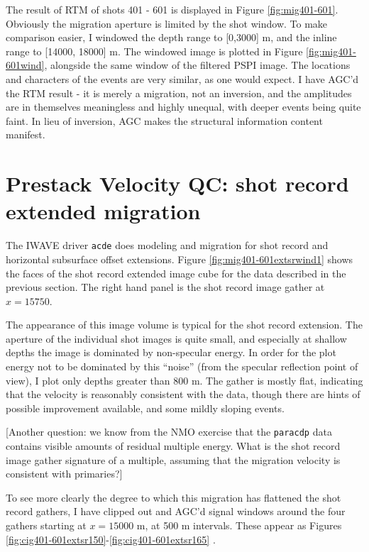 The result of RTM of shots 401 - 601 is displayed in Figure \ref{fig:mig401-601}. Obviously the migration aperture is limited by the shot window. To make comparison easier, I windowed the depth range to [0,3000] m, and the inline range to [14000, 18000] m. The windowed image is plotted in Figure \ref{fig:mig401-601wind}, alongside the same window of the filtered PSPI image. The locations and characters of the events are very similar, as one would expect. I have AGC'd the RTM result - it is merely a migration, not an inversion, and the amplitudes are in themselves meaningless and highly unequal, with deeper events being quite faint. In lieu of inversion, AGC makes the structural information content manifest.

\section{Prestack Velocity QC: shot record extended migration}

The IWAVE driver {\tt acde} does modeling and migration for shot record and horizontal subsurface offset extensions. Figure \ref{fig:mig401-601extsrwind1} shows the faces of the shot record extended image cube for the data described in the previous section. The right hand panel is the shot record image gather at $x=15750$.

The appearance of this image volume is typical for the shot record extension. The aperture of the individual shot images is quite small, and especially at shallow depths the image is dominated by non-specular energy. In order for the plot energy not to be dominated by this ``noise'' (from the specular reflection point of view), I plot only depths greater than 800 m. The gather is mostly flat, indicating that the velocity is reasonably consistent with the data, though there are hints of possible improvement available, and some mildly sloping events. 

[Another question: we know from the NMO exercise that the {\tt paracdp} data contains visible amounts of residual multiple energy. What is the shot record image gather signature of a multiple, assuming that the migration velocity is consistent with primaries?]

To see more clearly the degree to which this migration has flattened the shot record gathers, I have clipped out and AGC'd signal windows around the four gathers starting at $x=15000$ m, at 500 m intervals. These appear as Figures \ref{fig:cig401-601extsr150}-\ref{fig:cig401-601extsr165} .

